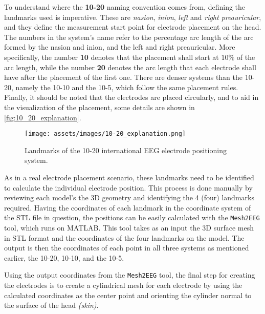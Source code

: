 To understand where the \textbf{10-20} naming convention comes from, defining the landmarks used is imperative. These are \textit{\gls{nasion}}, \textit{\gls{inion}}, \textit{left} and \textit{right \gls{preauricular}}, and they define the measurement start point for electrode placement on the head. The numbers in the system's name refer to the percentage arc length of the arc formed by the \gls{nasion} and \gls{inion}, and the left and right \gls{preauricular}. More specifically, the number \textbf{10} denotes that the placement shall start at $10\%$ of the arc length, while the number \textbf{20} denotes the arc length that each electrode shall have after the placement of the first one. There are denser systems than the 10-20, namely the 10-10 and the 10-5, which follow the same placement rules. Finally, it should be noted that the electrodes are placed circularly, and to aid in the visualization of the placement, some details are shown in \autoref{fig:10_20_explanation}.

\begin{figure}[H]
    \centering
    \texttt{[image: assets/images/10-20\_explanation.png]}
    \caption[Landmarks of the 10-20 international \gls{EEG} electrode positioning system]{Landmarks of the 10-20 international \gls{EEG} electrode positioning system. \cite[figure 13.2, p.368]{Malmivuo1995}}
    \label{fig:10_20_explanation}
\end{figure}

As in a real electrode placement scenario, these landmarks need to be identified to calculate the individual electrode position. This process is done manually by reviewing each model's the 3D geometry and identifying the 4 (four) landmarks required. Having the coordinates of each landmark in the coordinate system of the \gls{STL} file in question, the positions can be easily calculated with the \texttt{Mesh2EEG} \cite{Giacometti2014} tool, which runs on \gls{MATLAB}. This tool takes as an input the 3D surface mesh in \gls{STL} format and the coordinates of the four landmarks on the model. The output is then the coordinates of each point in all three systems as mentioned earlier, the 10-20, 10-10, and the 10-5.

Using the output coordinates from the \texttt{Mesh2EEG} \cite{Giacometti2014} tool, the final step for creating the electrodes is to create a cylindrical mesh for each electrode by using the calculated coordinates as the center point and orienting the cylinder normal to the surface of the head \textit{(skin)}.

